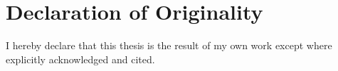 \chapter*{Declaration of Originality}

I hereby declare that this thesis is the result of my own work except where explicitly acknowledged and cited.
